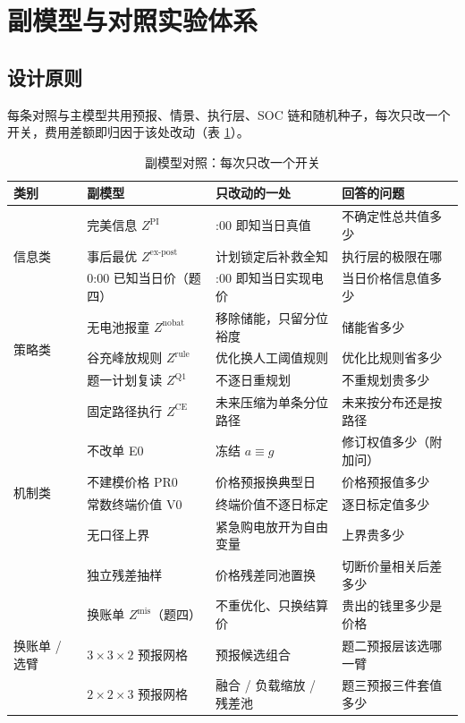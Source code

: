 \documentclass[12pt,a4paper]{ctexart}
\newcommand{\ZCE}{Z^{\mathrm{CE}}}
\newcommand{\Zep}{Z^{\mathrm{ex\text{-}post}}}
\newcommand{\ZPI}{Z^{\mathrm{PI}}}
\newcommand{\Zmis}{Z^{\mathrm{mis}}}
\begin{document}
\section{副模型与对照实验体系}\label{sec:aux}

\subsection{设计原则}

每条对照与主模型共用预报、情景、执行层、SOC 链和随机种子，每次只改一个开关，费用差额即归因于该处改动（表 \ref{tab:auxmap}）。

\begin{table}[H]
\centering\small
\caption{副模型对照：每次只改一个开关}
\begin{tabularx}{\textwidth}{ll>{\raggedright\arraybackslash}X>{\raggedright\arraybackslash}X}
\toprule
类别 & 副模型 & 只改动的一处 & 回答的问题 \\
\midrule
\multirow{3}{*}{信息类}
 & 完美信息 $\ZPI$ & 0:00 即知当日真值 & 不确定性总共值多少 \\
 & 事后最优 $\Zep$ & 计划锁定后补救全知 & 执行层的极限在哪 \\
 & 0:00 已知当日价（题四） & 0:00 即知当日实现电价 & 当日价格信息值多少 \\
\midrule
\multirow{3}{*}{策略类}
 & 无电池报童 $Z^{\mathrm{nobat}}$ & 移除储能，只留分位裕度 & 储能省多少 \\
 & 谷充峰放规则 $Z^{\mathrm{rule}}$ & 优化换人工阈值规则 & 优化比规则省多少 \\
 & 题一计划复读 $Z^{\mathrm{Q1}}$ & 不逐日重规划 & 不重规划贵多少 \\
\midrule
\multirow{6}{*}{机制类}
 & 固定路径执行 $\ZCE$ & 未来压缩为单条分位路径 & 未来按分布还是按路径 \\
 & 不改单 E0 & 冻结 $a\equiv g$ & 修订权值多少（附加问） \\
 & 不建模价格 PR0 & 价格预报换典型日 & 价格预报值多少 \\
 & 常数终端价值 V0 & 终端价值不逐日标定 & 逐日标定值多少 \\
 & 无口径上界 & 紧急购电放开为自由变量 & 上界贵多少 \\
 & 独立残差抽样 & 价格残差同池置换 & 切断价量相关后差多少 \\
\midrule
\multirow{3}{*}{换账单 / 选臂}
 & 换账单 $\Zmis$（题四） & 不重优化、只换结算价 & 贵出的钱里多少是价格 \\
 & $3\times3\times2$ 预报网格 & 预报候选组合 & 题二预报层该选哪一臂 \\
 & $2\times2\times3$ 预报网格 & 融合 / 负载缩放 / 残差池 & 题三预报三件套值多少 \\
\bottomrule
\end{tabularx}
\label{tab:auxmap}
\end{table}
\end{document}
